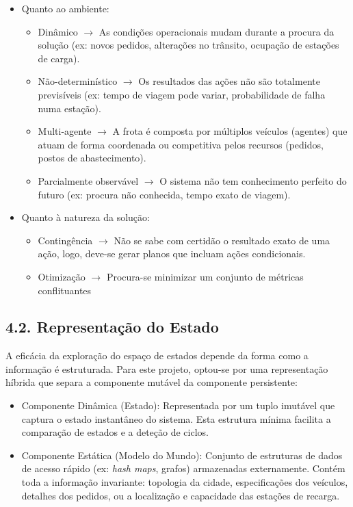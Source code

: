 \documentclass[a4paper]{article}
\begin{document}
\begin{itemize}
    \item Quanto ao ambiente:
        \begin{itemize}
            \item Dinâmico $\rightarrow$ As condições operacionais mudam durante a procura da solução (ex: novos pedidos, alterações no trânsito, ocupação de estações de carga).
            \item Não-determinístico $\rightarrow$ Os resultados das ações não são totalmente previsíveis (ex: tempo de viagem pode variar, probabilidade de falha numa estação).
            \item Multi-agente $\rightarrow$ A frota é composta por múltiplos veículos (agentes) que atuam de forma coordenada ou competitiva pelos recursos (pedidos, postos de abastecimento).
            \item Parcialmente observável $\rightarrow$ O sistema não tem conhecimento perfeito do futuro (ex: procura não conhecida, tempo exato de viagem).
        \end{itemize}
    \item Quanto à natureza da solução:
        \begin{itemize}
            \item Contingência $\rightarrow$ Não se sabe com certidão o resultado exato de uma ação, logo, deve-se gerar planos que incluam ações condicionais.
            \item Otimização $\rightarrow$ Procura-se minimizar um conjunto de métricas conflituantes
        \end{itemize}
\end{itemize}

\subsection*{4.2. Representação do Estado}
\noindent A eficácia da exploração do espaço de estados depende da forma como a informação é estruturada. Para este projeto, optou-se por uma representação híbrida que separa a componente mutável da componente persistente:

\begin{itemize}
    \item Componente Dinâmica (Estado): Representada por um tuplo imutável que captura o estado instantâneo do sistema. Esta estrutura mínima facilita a comparação de estados e a deteção de ciclos.
    \item Componente Estática (Modelo do Mundo): Conjunto de estruturas de dados de acesso rápido (ex: \textit{hash maps}, grafos) armazenadas externamente. Contém toda a informação invariante: topologia da cidade, especificações dos veículos, detalhes dos pedidos, ou a localização e capacidade das estações de recarga.
\end{itemize}
\end{document}
